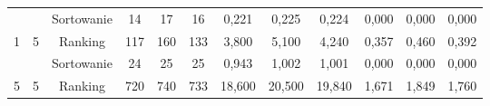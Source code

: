 \documentclass[magisterska]{pracamgr}
\begin{document}
\begin{table}[H]
{\begin{tabular}{@{}cccccccccccc@{}}
                                                                &                                                         & Sortowanie & 14                                                      & 17                                                      & 16                                                         & 0,221                                                      & 0,225                                                      & 0,224                                                          & 0,000                                                              & 0,000                                                               & 0,000                                                                  \\
1                                                               & 5                                                       & Ranking    & 117                                                     & 160                                                     & 133                                                        & 3,800                                                      & 5,100                                                      & 4,240                                                          & 0,357                                                              & 0,460                                                               & 0,392                                                                  \\ \midrule
                                                                &                                                         & Sortowanie & 24                                                      & 25                                                      & 25                                                         & 0,943                                                      & 1,002                                                      & 1,001                                                          & 0,000                                                              & 0,000                                                               & 0,000                                                                  \\
5                                                               & 5                                                       & Ranking    & 720                                                     & 740                                                     & 733                                                        & 18,600                                                     & 20,500                                                     & 19,840                                                         & 1,671                                                              & 1,849                                                               & 1,760                                                                  \\ \midrule

\end{tabular}}
\end{table}
\end{document}
